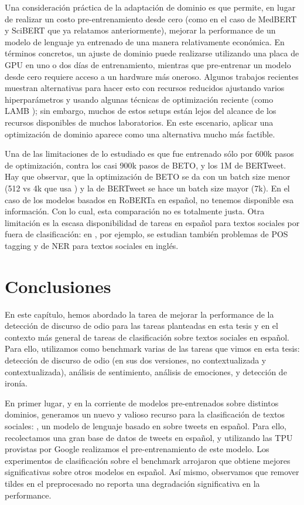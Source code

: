 Una consideración práctica de la adaptación de dominio es que permite, en lugar de realizar un costo pre-entrenamiento desde cero (como en el caso de MedBERT y SciBERT que ya relatamos anteriormente), mejorar la performance de un modelo de lenguaje ya entrenado de una manera relativamente económica. En términos concretos, un ajuste de dominio puede realizarse utilizando una placa de GPU en uno o dos días de entrenamiento, mientras que pre-entrenar un modelo desde cero requiere acceso a un hardware más oneroso. Algunos trabajos recientes \cite{izsak2021train} muestran alternativas para hacer esto con recursos reducidos ajustando varios hiperparámetros y usando algunas técnicas de optimización reciente (como LAMB \cite{you2019large}); sin embargo, muchos de estos setups están lejos del alcance de los recursos disponibles de muchos laboratorios. En este escenario, aplicar una optimización de dominio aparece como una alternativa mucho más factible.

Una de las limitaciones de lo estudiado es que \robertuito{} fue entrenado sólo por 600k pasos de optimización, contra los casi 900k pasos de BETO, y los 1M de BERTweet. Hay que observar, que la optimización de BETO se da con un batch size menor (512 vs 4k que usa \robertuito{}) y la de BERTweet se hace un batch size mayor (7k). En el caso de los modelos basados en RoBERTa en español, no tenemos disponible esa información. Con lo cual, esta comparación no es totalmente justa. Otra limitación es la escasa disponibilidad de tareas en español para textos sociales por fuera de clasificación: en \citet{bertweet}, por ejemplo, se estudian también problemas de POS tagging y de NER para textos sociales en inglés.

\section{Conclusiones}

En este capítulo, hemos abordado la tarea de mejorar la performance de la detección de discurso de odio para las tareas planteadas en esta tesis y en el contexto más general de tareas de clasificación sobre textos sociales en español. Para ello, utilizamos como benchmark varias de las tareas que vimos en esta tesis: detección de discurso de odio (en sus dos versiones, no contextualizada y contextualizada), análisis de sentimiento, análisis de emociones, y detección de ironía.

En primer lugar, y en la corriente de modelos pre-entrenados sobre distintos dominios, generamos un nuevo y valioso recurso para la clasificación de textos sociales: \robertuito{}, un modelo de lenguaje basado en \roberta{} sobre tweets en español. Para ello, recolectamos una gran base de datos de tweets en español, y utilizando las TPU provistas por Google realizamos el pre-entrenamiento de este modelo. Los experimentos de clasificación sobre el benchmark arrojaron que \robertuito{} obtiene mejores significativas sobre otros modelos en español. Así mismo, observamos que remover tildes en el preprocesado no reporta una degradación significativa en la performance.

